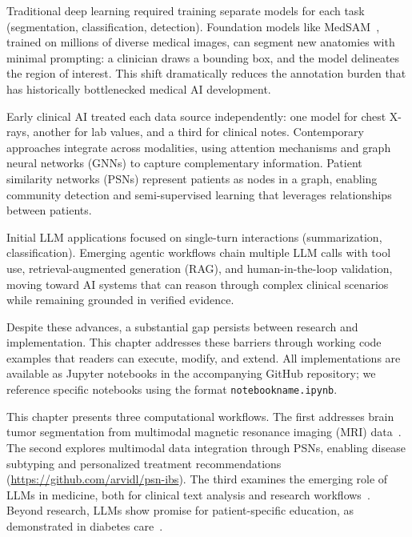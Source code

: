 \documentclass[krantz2,ChapterTOCs]{krantz}
\newcommand{\notebook}[1]{\texttt{\def\_{\textunderscore\allowbreak}#1}}
\begin{document}
\begin{description}[style=nextline, leftmargin=1em, labelindent=0pt, itemsep=0.2ex]
\item[From task-specific to foundation models]
Traditional deep learning required training separate models for each task (segmentation, classification, detection).
Foundation models like MedSAM~\citep{ma2025medsam2}, trained on millions of diverse medical images, can segment new anatomies with minimal prompting: a clinician draws a bounding box, and the model delineates the region of interest.
This shift dramatically reduces the annotation burden that has historically bottlenecked medical AI development.

\item[From siloed to multimodal integration]
Early clinical AI treated each data source independently: one model for chest X-rays, another for lab values, and a third for clinical notes.
Contemporary approaches integrate across modalities, using attention mechanisms and graph neural networks (GNNs) to capture complementary information.
Patient similarity networks (PSNs) represent patients as nodes in a graph, enabling community detection and semi-supervised learning that leverages relationships between patients.

\item[From static to agentic AI]
Initial LLM applications focused on single-turn interactions (summarization, classification).
Emerging agentic workflows chain multiple LLM calls with tool use, retrieval-augmented generation (RAG), and human-in-the-loop validation, moving toward AI systems that can reason through complex clinical scenarios while remaining grounded in verified evidence.
\end{description}

Despite these advances, a substantial gap persists between research and implementation. 
This chapter addresses these barriers through working code examples that readers can execute, modify, and extend.
All implementations are available as Jupyter notebooks in the accompanying GitHub repository; we reference specific notebooks using the format \notebook{notebook\_name.ipynb}.

This chapter presents three computational workflows. 
The first addresses brain tumor segmentation from multimodal magnetic resonance imaging (MRI) data~\citep{dorfner2025brain}. 
The second explores multimodal data integration through PSNs, enabling disease subtyping and personalized treatment recommendations~\citep{valous2024graph,lundervold2026psn} ({\small \url{https://github.com/arvidl/psn-ibs}}). 
The third examines the emerging role of LLMs in medicine, both for clinical text analysis and research workflows~\citep{raza2024generative}. Beyond research, LLMs show promise for patient-specific education, as demonstrated in diabetes care~\citep{skjervold2025diaguide}. 
\end{document}
